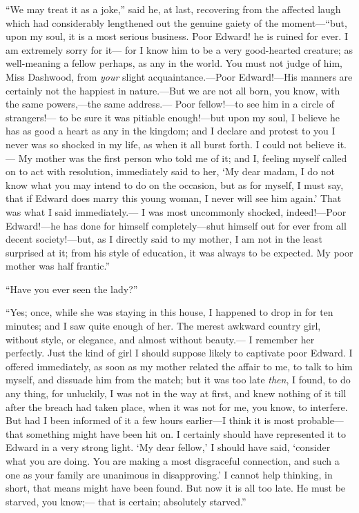 \documentclass{article}
\begin{document}
``We may treat it as a joke,'' said he, at last,
recovering from the affected laugh which had considerably
lengthened out the genuine gaiety of the moment---``but, upon
my soul, it is a most serious business.  Poor Edward!
he is ruined for ever.  I am extremely sorry for it---%
for I know him to be a very good-hearted creature; as
well-meaning a fellow perhaps, as any in the world.
You must not judge of him, Miss Dashwood, from \emph{your}
slight acquaintance.---Poor Edward!---His manners are certainly
not the happiest in nature.---But we are not all born,
you know, with the same powers,---the same address.---%
Poor fellow!---to see him in a circle of strangers!---%
to be sure it was pitiable enough!---but upon my soul,
I believe he has as good a heart as any in the kingdom;
and I declare and protest to you I never was so shocked in my
life, as when it all burst forth.  I could not believe it.---%
My mother was the first person who told me of it;
and I, feeling myself called on to act with resolution,
immediately said to her, `My dear madam, I do not know
what you may intend to do on the occasion, but as for myself,
I must say, that if Edward does marry this young woman,
I never will see him again.' That was what I said immediately.---%
I was most uncommonly shocked, indeed!---Poor Edward!---he has
done for himself completely---shut himself out for ever from
all decent society!---but, as I directly said to my mother,
I am not in the least surprised at it; from his style
of education, it was always to be expected.  My poor mother
was half frantic.''

``Have you ever seen the lady?''

``Yes; once, while she was staying in this house,
I happened to drop in for ten minutes; and I saw
quite enough of her.  The merest awkward country girl,
without style, or elegance, and almost without beauty.---%
I remember her perfectly.  Just the kind of girl I
should suppose likely to captivate poor Edward.
I offered immediately, as soon as my mother related
the affair to me, to talk to him myself, and dissuade
him from the match; but it was too late \emph{then}, I found,
to do any thing, for unluckily, I was not in the way
at first, and knew nothing of it till after the breach
had taken place, when it was not for me, you know,
to interfere.  But had I been informed of it a few
hours earlier---I think it is most probable---that something
might have been hit on.  I certainly should have represented
it to Edward in a very strong light.  `My dear fellow,'
I should have said, `consider what you are doing.
You are making a most disgraceful connection, and such a one
as your family are unanimous in disapproving.' I cannot
help thinking, in short, that means might have been found.
But now it is all too late.  He must be starved, you know;---%
that is certain; absolutely starved.''
\end{document}

